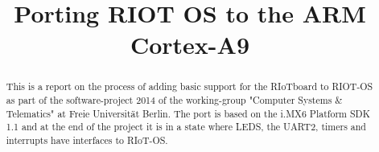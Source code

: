 \documentclass[conference,a4paper]{IEEEtran}
\begin{document}
\title{Porting RIOT OS to the ARM Cortex\texttrademark-A9}

\author{
}

\maketitle

\begin{abstract}
This is a report on the process of adding basic support for the RIoTboard to RIOT-OS as
part of the software-project 2014 of the working-group "Computer Systems \& Telematics"
at Freie Universität Berlin.
The port is based on the i.MX6 Platform SDK 1.1 and at the end of the project it is in a
state where LEDS, the UART2, timers and interrupts have interfaces to RIoT-OS.
\end{abstract}

\IEEEpeerreviewmaketitle








%
%
\end{document}
